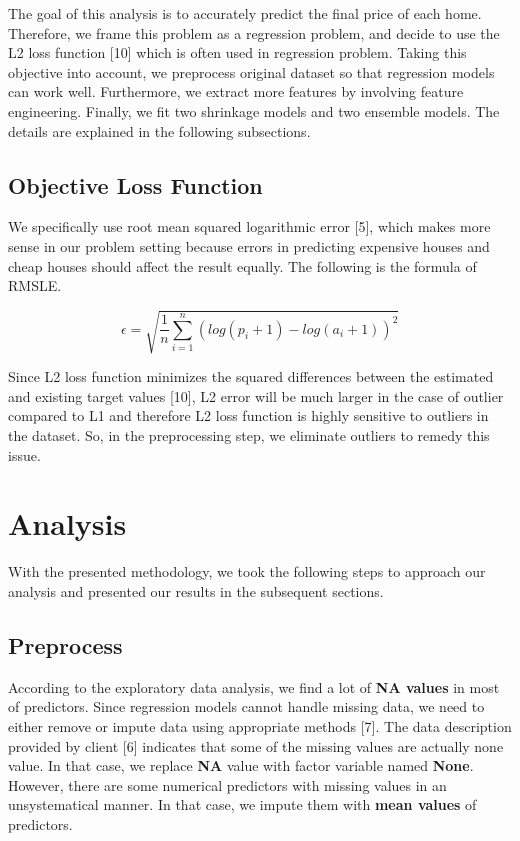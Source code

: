 \documentclass[a4paper]{article}
\begin{document}
\begin{flushleft}
The goal of this analysis is to accurately predict the final price of each home. Therefore, we frame this problem as a regression problem, and decide to use the L2 loss function [10] which is often used in regression problem. Taking this objective into account, we preprocess original dataset so that regression models can work well. Furthermore, we extract more features by involving feature engineering. Finally, we fit two shrinkage models and two ensemble models. The details are explained in the following subsections.

\subsection{Objective Loss Function}

We specifically use root mean squared logarithmic error [5], which makes more sense in our problem setting because errors in predicting expensive houses and cheap houses should affect the result equally. The following is the formula of RMSLE. \newline

$$
\epsilon = \sqrt{\frac{1}{n} \sum_{i=1}^{n} (log(p_{i} + 1) - log(a_{i} + 1))^2}
$$

Since L2 loss function minimizes the squared differences between the estimated and existing target values [10], L2 error will be much larger in the case of outlier compared to L1 and therefore L2 loss function is highly sensitive to outliers in the dataset. So, in the preprocessing step, we eliminate outliers to remedy this issue. \newline


\section{Analysis}
With the presented methodology, we took the following steps to approach our analysis and presented our results in the subsequent sections.

\subsection{Preprocess}
According to the exploratory data analysis, we find a lot of \textbf{NA values} in most of predictors. Since regression models cannot handle missing data, we need to either remove or impute data using appropriate methods [7]. The data description provided by client [6] indicates that some of the missing values are actually none value. In that case, we replace \textbf{NA} value with factor variable named \textbf{None}. However, there are some numerical predictors with missing values in an unsystematical manner. In that case, we impute them with \textbf{mean values} of predictors. \newline


\end{flushleft}
\end{document}
